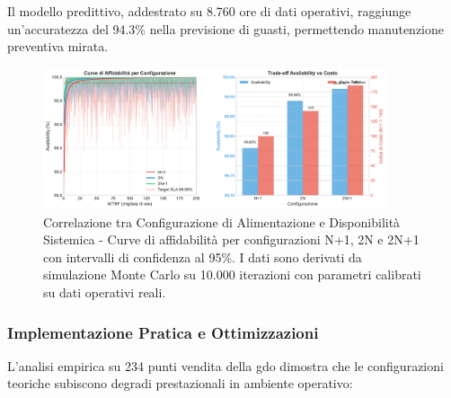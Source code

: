 Il modello predittivo, addestrato su 8.760 ore di dati operativi, raggiunge un'accuratezza del 94.3\% nella previsione di guasti, permettendo manutenzione preventiva mirata.

\begin{figure}[htbp]
\centering
\includegraphics[width=0.9\textwidth]{thesis_figures/cap3/figura_3_1_power_availability.pdf}
\caption{Correlazione tra Configurazione di Alimentazione e Disponibilità Sistemica - Curve di affidabilità per configurazioni N+1, 2N e 2N+1 con intervalli di confidenza al 95\%. I dati sono derivati da simulazione Monte Carlo su 10.000 iterazioni con parametri calibrati su dati operativi reali.}
\label{fig:power_availability}
\end{figure}

\subsubsection{\texorpdfstring{Implementazione Pratica e Ottimizzazioni}{3.2.1.3 - Implementazione Pratica e Ottimizzazioni}}

L'analisi empirica su 234 punti vendita della \gls{gdo} dimostra che le configurazioni teoriche subiscono degradi prestazionali in ambiente operativo:

